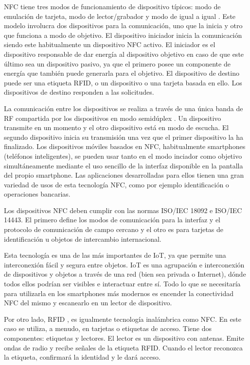 \documentclass[12pt,a4paper,onecolumn,oneside]{report}
\begin{document}
NFC tiene tres modos de funcionamiento de dispositivo típicos: modo de emulación de tarjeta, modo de lector/grabador y modo de igual a igual \cite{tres}. Este modelo involucra dos dispositivos para la comunicación, uno que la inicia y otro que funciona a modo de objetivo. El dispositivo iniciador inicia la comunicación siendo este habitualmente un dispositivo NFC activo. El iniciador es el dispositivo responsable de dar energía al dispositivo objetivo en caso de que este último sea un dispositivo pasivo, ya que el primero posee un componente de energía que también puede generarla para el objetivo. El dispositivo de destino puede ser una etiqueta RFID, o un dispositivo o una tarjeta basada en ello. Los dispositivos de destino responden a las solicitudes.

La comunicación entre los dispositivos se realiza a través de una única banda de RF compartida por los dispositivos en modo semidúplex \cite{cuatro}. Un dispositivo transmite en un momento y el otro dispositivo está en modo de escucha. El segundo dispositivo inicia su transmisión una vez que el primer dispositivo la ha finalizado. Los dispositivos móviles basados en NFC, habitualmente smartphones (teléfonos inteligentes), se pueden usar tanto en el modo inciador como objetivo simultáneamente mediante el uso sencillo de la interfaz disponible en la pantalla del propio smartphone. Las aplicaciones desarrolladas para ellos tienen una gran variedad de usos de esta tecnología NFC, como por ejemplo identificación o operaciones bancarias.

Los dispositivos NFC deben cumplir con las normas ISO/IEC 18092 e ISO/IEC 14443. El primero define los modos de comunicación para la interfaz y el protocolo de comunicación de campo cercano y el otro es para tarjetas de identificación u objetos de intercambio internacional.

Esta tecnología es una de las más importantes de IoT, ya que permite una interconexión fácil y segura entre objetos. IoT es una agrupación e interconexión de dispositivos y objetos a través de una red (bien sea privada o Internet), dónde todos ellos podrían ser visibles e interactuar entre sí. Todo lo que se necesitaría para utilizarla en los smartphones más modernos es encender la conectividad NFC del mismo y escanearlo en un lector de dispositivo.

Por otro lado, RFID , es igualmente tecnología inalámbrica como NFC. En este caso se utiliza, a menudo, en tarjetas o etiquetas de acceso. Tiene dos componentes: etiquetas y lectores. El lector es un dispositivo con antenas. Emite ondas de radio y recibe señales de la etiqueta RFID. Cuando el lector reconozca la etiqueta, confirmará la identidad y le dará acceso. 
\end{document}
